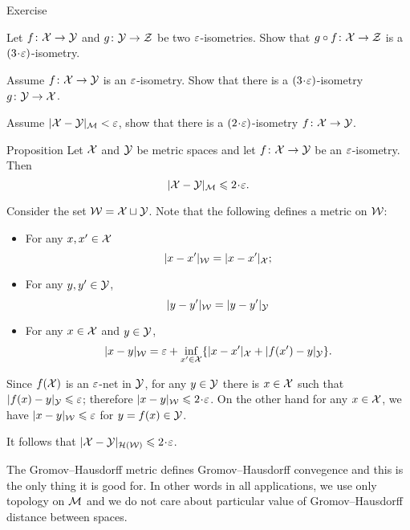 \begin{thm}{Exercise}\label{ex:alm-isom:compositon}\label{ex:alm-isom:inverse}\label{ex:GH=>eps-isom}
\begin{subthm}{}
Let $f\colon\mathcal{X}\to \mathcal{Y}$ and $g\colon\mathcal{Y}\to \mathcal{Z}$ be two $\varepsilon$-isometries.
Show that $g\circ f\colon \mathcal{X}\to \mathcal{Z}$ is a $(3\cdot\eps)$-isometry.
\end{subthm}

\begin{subthm}{}
Assume $f\: \spc{X} \z\to \spc{Y}$ is an $\varepsilon$-isometry.
Show that there is a $(3\cdot\eps)$-isometry 
$g\colon \mathcal{Y}\to \mathcal{X}$.
\end{subthm}

\begin{subthm}{}
 Assume $|\mathcal{X}-\mathcal{Y}|_{\mathcal{M}}<\varepsilon$, show that there is a $(2\cdot\eps)$-isometry 
$f\colon \mathcal{X}\to \mathcal{Y}$.
\end{subthm}
\end{thm}

\begin{thm}{Proposition}\label{prop:alm-isom=>GH}
Let $\mathcal{X}$ and $\mathcal{Y}$ be metric spaces 
and let $f\colon \mathcal{X}\to \mathcal{Y}$ be an $\varepsilon$-isometry.
Then 
\[|\spc{X}-\spc{Y}|_{\spc{M}}\le 2\cdot \eps.\]
\end{thm}

 Consider the set $\mathcal{W}=\mathcal{X}\sqcup \mathcal{Y}$.
Note that the following defines a metric on $\mathcal{W}$:
\begin{itemize}
\item  For any $x,x'\in \mathcal{X}$
$$|x-x'|_{\mathcal{W}}=|x-x'|_{\mathcal{X}};$$
\item For any $y,y'\in \mathcal{Y}$,
$$|y-y'|_{\mathcal{W}}=|y-y'|_{\mathcal{Y}}$$
\item For any $x\in \mathcal{X}$ and $y\in \mathcal{Y}$,
$$|x-y|_{\mathcal{W}}=\varepsilon+\inf_{x'\in \mathcal{X}}\{|x-x'|_{\mathcal{X}}+|f(x')-y|_{\mathcal{Y}}\}.$$
\end{itemize}

Since $f(\mathcal{X})$ is an $\varepsilon$-net in $\mathcal{Y}$,
for any $y\in \mathcal{Y}$ there is $x\in \mathcal{X}$ such that $|f(x)-y|_{\spc{Y}}\z\le\eps$;
therefore $|x-y|_{\spc{W}}\le 2\cdot\eps$.
On the other hand for any $x\in \mathcal{X}$, we have $|x-y|_{\mathcal{W}}\leqslant\varepsilon$
for $y=f(x)\in \mathcal{Y}$.

It follows that $|\spc{X}-\spc{Y}|_{\mathcal{H}(\spc{W})}\le 2\cdot\eps$.
\qedsf

The Gromov--Hausdorff metric defines Gromov--Hausdorff convegence
and this is the only thing it is good for.
In other words in all applications, we use only topology on $\mathcal{M}$
and we do not care about particular value of Gromov--Hausdorff distance between spaces.

